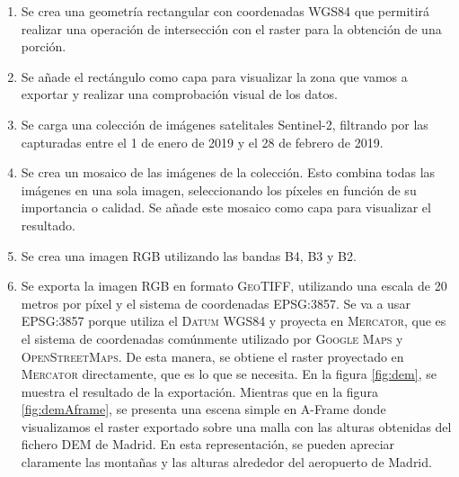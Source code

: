 \documentclass[a4paper, 11pt]{book}
\begin{document}
\begin{enumerate}
    \item Se crea una geometría rectangular con coordenadas \textsc{WGS84} que  permitirá realizar una operación de intersección con el raster para la obtención de una porción.
    \item Se añade el rectángulo como capa para visualizar la zona que vamos a exportar y realizar una comprobación visual de los datos.
    \item Se carga una colección de imágenes satelitales Sentinel-2, filtrando por las capturadas entre el 1 de enero de 2019 y el 28 de febrero de 2019.
    \item Se crea un mosaico de las imágenes de la colección. Esto combina todas las imágenes en una sola imagen, seleccionando los píxeles en función de su importancia o calidad. Se añade este mosaico como capa para visualizar el resultado.
    \item Se crea una imagen \textsc{RGB} utilizando las bandas B4, B3 y B2.
    \item Se exporta la imagen \textsc{RGB} en formato \textsc{GeoTIFF}, utilizando una escala de 20 metros por píxel y el sistema de coordenadas \textsc{EPSG:3857}. Se va a usar \textsc{EPSG:3857} porque utiliza el \textsc{Datum WGS84} y proyecta en \textsc{Mercator}, que es el sistema de coordenadas comúnmente utilizado por \textsc{Google Maps} y \textsc{OpenStreetMaps}. De esta manera, se obtiene el raster proyectado en \textsc{Mercator} directamente, que es lo que se necesita.
    En la figura \ref{fig:dem}, se muestra el resultado de la exportación. Mientras que en la figura \ref{fig:demAframe}, se presenta una escena simple en A-Frame donde visualizamos el raster exportado sobre una malla con las alturas obtenidas del fichero DEM de Madrid. En esta representación, se pueden apreciar claramente las montañas y las alturas alrededor del aeropuerto de Madrid.
\end{enumerate}
\label{manual:generacionRaster}
\end{document}
